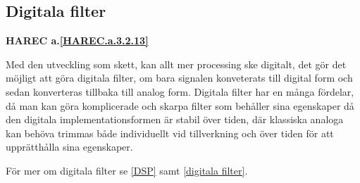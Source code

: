 \subsection{Digitala filter}
\textbf{HAREC a.\ref{HAREC.a.3.2.13}\label{myHAREC.a.3.2.13}}

Med den utveckling som skett, kan allt mer processing ske digitalt, det gör
det möjligt att göra digitala filter, om bara signalen konveterats till
digital form och sedan konverteras tillbaka till analog form.
Digitala filter har en många fördelar, då man kan göra komplicerade och
skarpa filter som behåller sina egenskaper då den digitala implementationsformen
är stabil över tiden, där klassiska analoga kan behöva trimmas både
individuellt vid tillverkning och över tiden för att upprätthålla sina
egenskaper.

För mer om digitala filter se \ref{DSP} samt \ref{digitala filter}.
